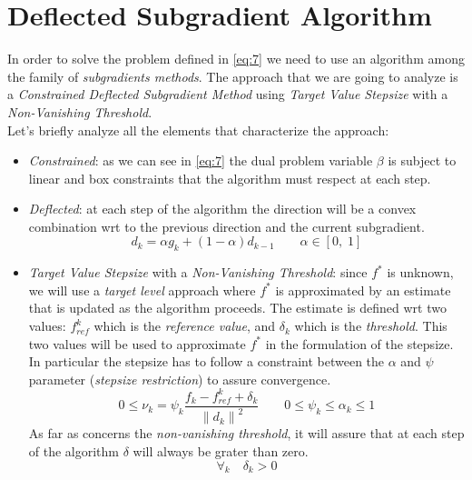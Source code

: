 \documentclass[12pt]{article}
\newcommand{\norm}[1]{\left\lVert#1\right\rVert}
\begin{document}
	\section{Deflected Subgradient Algorithm}
	In order to solve the problem defined in \eqref{eq:7} we need to use an algorithm among the family of \textit{subgradients methods}.
    The approach that we are going to analyze is a \textit{Constrained Deflected Subgradient Method} using \textit{Target Value Stepsize} with a \textit{Non-Vanishing Threshold}.\\
    Let's briefly analyze all the elements that characterize the approach:
    \begin{itemize}
        \item \textit{Constrained}: as we can see in \eqref{eq:7} the dual problem variable $\beta$ is subject to linear and box constraints that the algorithm must respect at each step.
        
        \item \textit{Deflected}: at each step of the algorithm the direction will be a convex combination wrt to the previous direction and the current subgradient.
        \begin{equation}\label{eq:8}
            d_k = \alpha g_k + (1 - \alpha) d_{k-1} \qquad \alpha \in [0,\;1]
        \end{equation}
        
        \item \textit{Target Value Stepsize} with a \textit{Non-Vanishing Threshold}: since $f^*$ is unknown, we will use a \textit{target level} approach where $f^*$ is approximated by an estimate that is updated as the algorithm proceeds. The estimate is defined wrt two values: $f_{ref}^k$ which is the \emph{reference value}, and $\delta_k$ which is the \emph{threshold}. This two values will be used to approximate $f^*$ in the formulation of the stepsize. In particular the stepsize has to follow a constraint between the $\alpha$ and $\psi$ parameter (\textit{stepsize restriction}) to assure convergence.
        \begin{equation}\label{eq:9}
            0 \leq \nu_k = \psi_k \frac{f_k - f_{ref}^k + \delta_k}{\norm{d_k}^2} \qquad 0 \leq \psi_k \leq \alpha_k \leq 1 
        \end{equation}
        As far as concerns the \textit{non-vanishing threshold}, it will assure that at each step of the algorithm $\delta$ will always be grater than zero.
        \begin{equation}\label{eq:10}
            \forall_k \quad \delta_k > 0
        \end{equation}
    \end{itemize}
\end{document}
